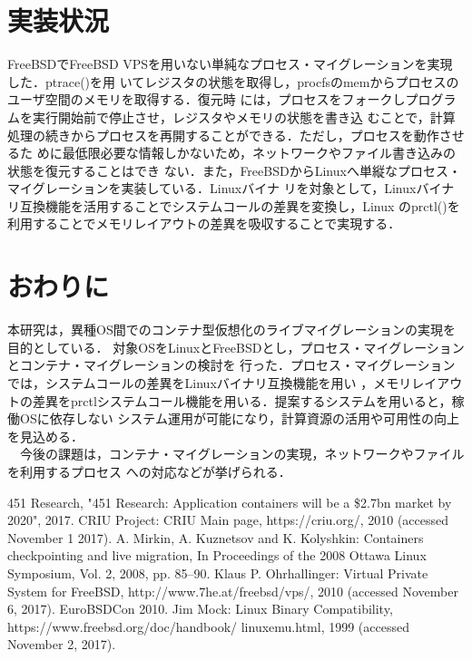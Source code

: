 \documentclass[11pt]{jarticle}
\begin{document}
\section{実装状況}
FreeBSDでFreeBSD VPSを用いない単純なプロセス・マイグレーションを実現した．ptrace()を用
いてレジスタの状態を取得し，procfsのmemからプロセスのユーザ空間のメモリを取得する．復元時
には，プロセスをフォークしプログラムを実行開始前で停止させ，レジスタやメモリの状態を書き込
むことで，計算処理の続きからプロセスを再開することができる．ただし，プロセスを動作させるた
めに最低限必要な情報しかないため，ネットワークやファイル書き込みの状態を復元することはでき
ない．また，FreeBSDからLinuxへ単縦なプロセス・マイグレーションを実装している．Linuxバイナ
リを対象として，Linuxバイナリ互換機能を活用することでシステムコールの差異を変換し，Linux
のprctl()を利用することでメモリレイアウトの差異を吸収することで実現する．

\section{おわりに}
本研究は，異種OS間でのコンテナ型仮想化のライブマイグレーションの実現を目的としている．
対象OSをLinuxとFreeBSDとし，プロセス・マイグレーションとコンテナ・マイグレーションの検討を
行った．プロセス・マイグレーションでは，システムコールの差異をLinuxバイナリ互換機能を用い
，メモリレイアウトの差異をprctlシステムコール機能を用いる．提案するシステムを用いると，稼働OSに依存しない
システム運用が可能になり，計算資源の活用や可用性の向上を見込める．\\
　今後の課題は，コンテナ・マイグレーションの実現，ネットワークやファイルを利用するプロセス
への対応などが挙げられる．



\begin{thebibliography}{99}
	451 Research, "451 Research: Application containers will be a \$2.7bn market by 2020", 2017.
	CRIU Project: CRIU Main page, https://criu.org/, 2010 (accessed November 1 2017).
  A. Mirkin, A. Kuznetsov and K. Kolyshkin: Containers checkpointing and live migration, In Proceedings of the 2008 Ottawa Linux Symposium, Vol. 2, 2008, pp. 85–90.
Klaus P. Ohrhallinger: Virtual Private System for FreeBSD, http://www.7he.at/freebsd/vps/, 2010 (accessed November 6, 2017). EuroBSDCon 2010.
Jim Mock: Linux Binary Compatibility, https://www.freebsd.org/doc/handbook/
linuxemu.html, 1999 (accessed November 2, 2017).
\end{thebibliography}
\end{document}
